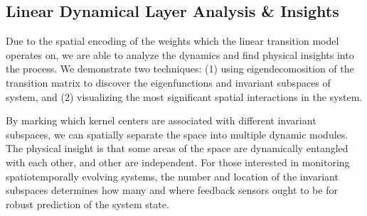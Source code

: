 \documentclass[letterpaper,12pt,peerreviewca,draftcls]{IEEEtran}
\begin{document}
\subsection{Linear Dynamical Layer Analysis \& Insights}\label{sec:analysis}
Due to the spatial encoding of the weights which the linear transition model operates on, we are able to analyze the dynamics and find physical insights into the process. We demonstrate two techniques: (1) using eigendecomosition of the transition matrix to discover the eigenfunctions and invariant subspaces of system, and (2) visualizing the most significant spatial interactions in the system.

By marking which kernel centers are associated with different invariant subspaces, we can spatially separate the space into multiple dynamic modules. The physical insight is that some areas of the space are dynamically entangled with each other, and other are independent. For those interested in monitoring spatiotemporally evolving systems, the number and location of the invariant subspaces determines how many and where feedback sensors ought to be for robust prediction of the system state.
\end{document}
